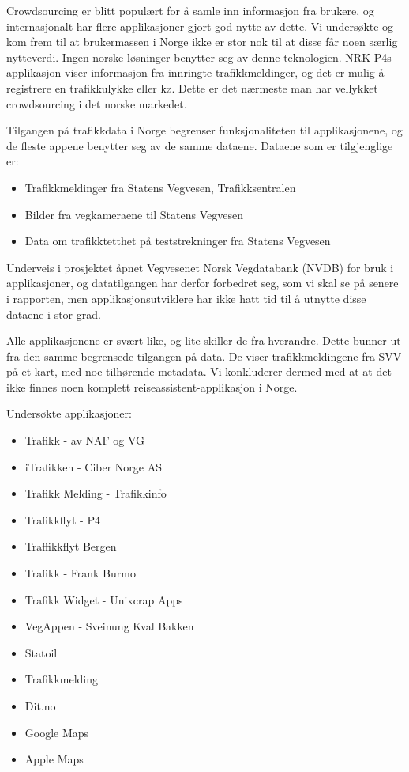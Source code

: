 \documentclass[a4paper,norsk,oneside]{book}
\begin{document}
Crowdsourcing er blitt populært for å samle inn informasjon fra brukere, og internasjonalt har flere applikasjoner gjort god nytte av dette.  Vi undersøkte og kom frem til at brukermassen i Norge ikke er stor nok til at disse får noen særlig nytteverdi. Ingen norske løsninger benytter seg av denne teknologien. NRK P4s applikasjon viser informasjon fra innringte trafikkmeldinger, og det er mulig å registrere en trafikkulykke eller kø. Dette er det nærmeste man har vellykket crowdsourcing i det norske markedet.

Tilgangen på trafikkdata i Norge begrenser funksjonaliteten til applikasjonene, og de fleste appene benytter seg av de samme dataene. Dataene som er tilgjenglige er:

\begin{itemize}
\item Trafikkmeldinger fra Statens Vegvesen, Trafikksentralen
\item Bilder fra vegkameraene til Statens Vegvesen
\item Data om trafikktetthet på teststrekninger fra Statens Vegvesen
\end{itemize}
Underveis i prosjektet åpnet Vegvesenet Norsk Vegdatabank (NVDB) for bruk i applikasjoner, og datatilgangen har derfor forbedret seg, som vi skal se på senere i rapporten, men applikasjonsutviklere har ikke hatt tid til å utnytte disse dataene i stor grad.

Alle applikasjonene er svært like, og lite skiller de fra hverandre. Dette bunner ut fra den samme begrensede tilgangen på data. De viser trafikkmeldingene fra SVV på et kart, med noe tilhørende metadata. Vi konkluderer dermed med at at det ikke finnes noen komplett reiseassistent-applikasjon i Norge.

Undersøkte applikasjoner:

\begin{itemize}
\item Trafikk - av NAF og VG
\item iTrafikken - Ciber Norge AS
\item Trafikk Melding - Trafikkinfo
\item Trafikkflyt - P4
\item Traffikkflyt Bergen
\item Trafikk - Frank Burmo
\item Trafikk Widget - Unixcrap Apps
\item VegAppen - Sveinung Kval Bakken
\item Statoil
\item Trafikkmelding
\item Dit.no
\item Google Maps
\item Apple Maps
\end{itemize}
\end{document}
